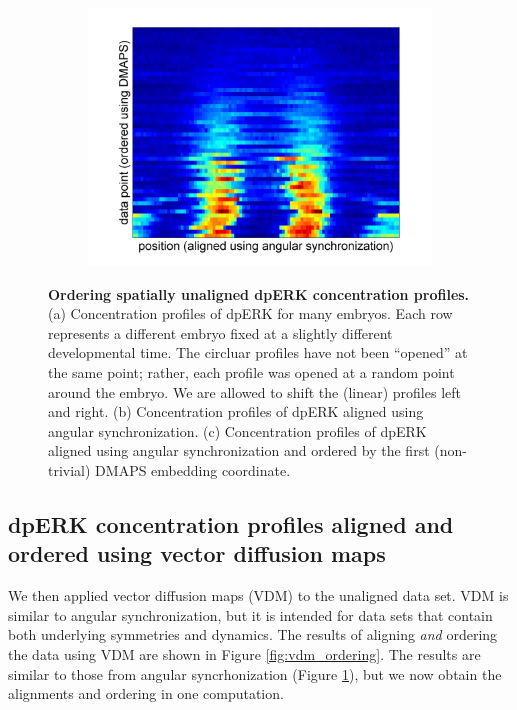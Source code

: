 \documentclass[10pt]{article}
\begin{document}
\begin{figure}[H]
\begin{subfigure}{0.3\textwidth}
\includegraphics[width=\textwidth]{data_ordered_angsynch}
\caption{}
\end{subfigure}
\caption{{\bf Ordering spatially unaligned dpERK concentration profiles.} (a) Concentration profiles of dpERK for many embryos. Each row represents a different embryo fixed at a slightly different developmental time. The circluar profiles have not been ``opened'' at the same point; rather, each profile was opened at a random point around the embryo. We are allowed to shift the (linear) profiles left and right.
(b) Concentration profiles of dpERK aligned using angular synchronization.
(c) Concentration profiles of dpERK aligned using angular synchronization and ordered by the first (non-trivial) DMAPS embedding coordinate.}
\label{fig:angsynch_ordering}
\end{figure}

\subsection*{dpERK concentration profiles aligned and ordered using vector diffusion maps}

We then applied vector diffusion maps (VDM) to the unaligned data set.
%
VDM is similar to angular synchronization, but it is intended for data sets that contain both underlying symmetries and dynamics.
%
The results of aligning {\em and} ordering the data using VDM are shown in Figure \ref{fig:vdm_ordering}.
%
The results are similar to those from angular syncrhonization (Figure \ref{fig:angsynch_ordering}), but we now obtain the alignments and ordering in one computation.
\end{document}
